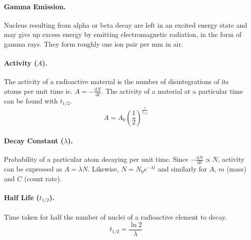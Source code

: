 \documentclass{article}
\begin{document}
\paragraph{Gamma Emission.} Nucleus resulting from alpha or beta decay are left
in an excited energy state and may give up excess energy by emitting
electromagnetic radiation, in the form of gamma rays. They form roughly one ion
pair per mm in air.

\paragraph{Activity ($A$).} The activity of a radioactive material is the number
of disintegrations of its atoms per unit time ie. $A =
-\frac{\mathrm{d}N}{\mathrm{d}t}$. The activity of a material at a particular time
can be found with $t_{1/2}$. \begin{equation} A = A_{0} \left(
  \frac{1}{2} \right) ^{\frac{t}{t_{1/2}}}
\end{equation}

\paragraph{Decay Constant ($\lambda$).} Probability of a particular atom
decaying per unit time. Since $-\frac{\mathrm{d}N}{\mathrm{d}t} \propto N$,
activity can be expressed as $A = \lambda N$. Likewise, $N = N_0e^{-\lambda t}$
and similarly for $A$, $m$ (mass) and $C$ (count rate).

\paragraph{Half Life ($t_{1/2}$).} Time taken for half the number of nuclei of a
radioactive element to decay. \begin{equation} t_{1/2} = \frac{\ln 2}{\lambda}
\end{equation}
\end{document}
